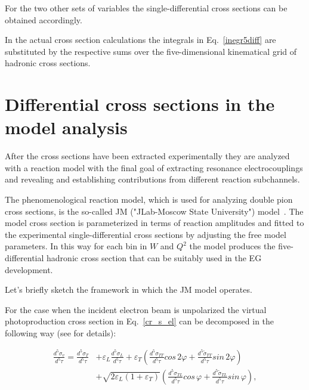 For the two other sets of variables the single-differential cross sections can be obtained accordingly.


In the actual cross section calculations the integrals in Eq.~\eqref{inegr5diff} are substituted by the respective sums over the five-dimensional  kinematical grid of hadronic cross sections. 

\section{Differential cross sections in the model analysis}
\label{sect:cr_sect_model}
After the cross sections have been extracted experimentally they are analyzed with a reaction model with the final goal of extracting resonance electrocouplings and revealing and establishing contributions from different reaction subchannels.  

The phenomenological reaction model, which is used for analyzing double pion cross sections, is the so-called JM ("JLab-Moscow State University") model~\cite{Mokeev:2008iw,Mokeev:2012vsa,Mokeev:2015lda}. The model cross section is parameterized in terms of reaction amplitudes and fitted to the experimental single-differential cross sections by adjusting the free model parameters. In this way for each bin in $W$ and $Q^2$ the model produces the five-differential hadronic cross section that can be suitably used in the EG development. 

Let's briefly sketch the framework in which the JM model operates.

For the case when the incident electron beam is unpolarized the virtual photoproduction cross section in Eq.~\eqref{cr_s_el} can be decomposed in the following way (see \cite{Skorodumina:2016pnb} for details):


 \begin{equation}\label{eq:str_fun_decomp}
\begin{aligned}
 \frac{d^{5}\sigma_{v}}{d^{5}\tau }  = \frac{d^{5}\sigma_{T}}{d^{5}\tau }&+\varepsilon _{L}\frac{d^{5}\sigma_{L}}{d^{5}\tau }+ \varepsilon_{T}\left (\frac{d^{5}\sigma_{TT}}{d^{5}\tau } cos\, 2\varphi + \frac{d^{5}\widetilde{\sigma}_{TT}}{d^{5}\tau } sin\, 2\varphi \right )\\
&+\sqrt{2\varepsilon _{L} ( 1+\varepsilon _{T})}\left (\frac{d^{5}\sigma_{TL}}{d^{5}\tau }cos\, \varphi +\frac{d^{5}\widetilde{\sigma}_{TL}}{d^{5}\tau } sin\, \varphi \right ),
\end{aligned}
\end{equation}



